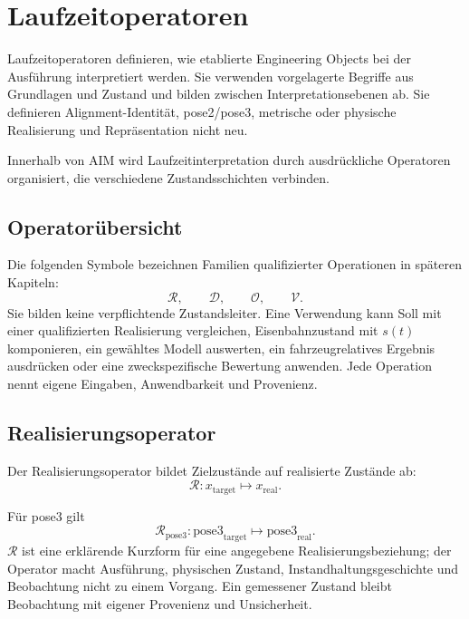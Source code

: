 
\chapter{Laufzeitoperatoren}
\label{chap:runtime-operators}

Laufzeitoperatoren definieren, wie etablierte Engineering Objects bei der
Ausführung interpretiert werden. Sie verwenden vorgelagerte Begriffe aus
Grundlagen und Zustand und bilden zwischen Interpretationsebenen ab. Sie
definieren Alignment-Identität, pose2/pose3, metrische oder physische
Realisierung und Repräsentation nicht neu.

\begin{principle}
\label{princ:operator-layer-principle}
Innerhalb von AIM wird Laufzeitinterpretation durch ausdrückliche Operatoren
organisiert, die verschiedene Zustandsschichten verbinden.
\end{principle}

\section{Operatorübersicht}

Die folgenden Symbole bezeichnen Familien qualifizierter Operationen in
späteren Kapiteln:
\[
\mathcal R,\qquad\mathcal D,\qquad\mathcal O,\qquad\mathcal V.
\]
Sie bilden keine verpflichtende Zustandsleiter. Eine Verwendung kann Soll mit
einer qualifizierten Realisierung vergleichen, Eisenbahnzustand mit \(s(t)\)
komponieren, ein gewähltes Modell auswerten, ein fahrzeugrelatives Ergebnis
ausdrücken oder eine zweckspezifische Bewertung anwenden. Jede Operation nennt
eigene Eingaben, Anwendbarkeit und Provenienz.

\section{Realisierungsoperator}

\begin{definition}[Realisierungsoperator]
\label{def:runtime-realization-operator}
Der Realisierungsoperator bildet Zielzustände auf realisierte Zustände ab:
\[
\mathcal R:x_{\mathrm{target}}\mapsto x_{\mathrm{real}}.
\]
\end{definition}
Für pose3 gilt
\[
\mathcal R_{\mathrm{pose3}}:
\mathrm{pose3}_{\mathrm{target}}\mapsto\mathrm{pose3}_{\mathrm{real}}.
\]
\(\mathcal R\) ist eine erklärende Kurzform für eine angegebene
Realisierungsbeziehung; der Operator macht Ausführung, physischen Zustand,
Instandhaltungsgeschichte und Beobachtung nicht zu einem Vorgang. Ein
gemessener Zustand bleibt Beobachtung mit eigener Provenienz und Unsicherheit.

